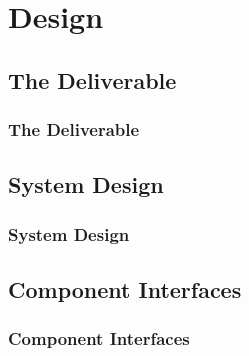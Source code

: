 \section{Design}

\subsection{The Deliverable}
\begin{frame}
\frametitle{The Deliverable}


\end{frame}

\subsection{System Design}
\begin{frame}
\frametitle{System Design}


\end{frame}

\subsection{Component Interfaces}
\begin{frame}
\frametitle{Component Interfaces}


\end{frame}
